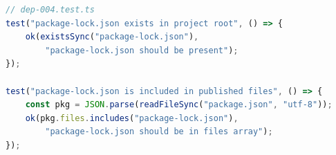 \begin{lstlisting}[language=TypeScript]
// dep-004.test.ts
test("package-lock.json exists in project root", () => {
    ok(existsSync("package-lock.json"),
        "package-lock.json should be present");
});

test("package-lock.json is included in published files", () => {
    const pkg = JSON.parse(readFileSync("package.json", "utf-8"));
    ok(pkg.files.includes("package-lock.json"),
        "package-lock.json should be in files array");
});
\end{lstlisting}

